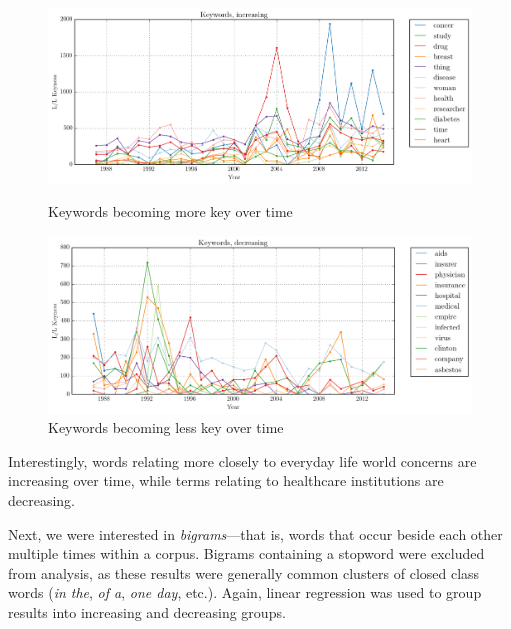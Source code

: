    \begin{figure}[htb!]
    \centering
    \begin{minipage}{.48\textwidth}
    \centering
    \includegraphics[width=.95\textwidth]{../images/keywords-increasing.png}
    \caption{Keywords becoming more key over time}
    \label{fig:key-inc}
    \end{minipage}%
    \begin{minipage}{.48\textwidth}
    \centering
    \includegraphics[width=.95\textwidth]{../images/keywords-decreasing.png}
    \caption{Keywords becoming less key over time}
    \label{fig:key-dec}
    \end{minipage}
    \end{figure}
    Interestingly, words relating more closely to everyday life world concerns are increasing over time, while terms relating to healthcare institutions are decreasing.

    Next, we were interested in \emph{bigrams}---that is, words that occur beside each other multiple times within a corpus. Bigrams containing a stopword were excluded from analysis, as these results were generally common clusters of closed class words (\emph{in the}, \emph{of a}, \emph{one day}, etc.). Again, linear regression was used to group results into increasing and decreasing groups.

